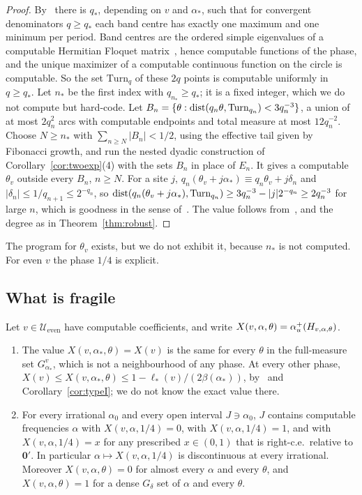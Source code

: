 \begin{proof}
By~\cite[Lemma~5.20(1)]{DMuniv} there is $q_*$, depending on $v$ and $\alpha_*$, such that for convergent denominators $q\ge q_*$ each band centre has exactly one maximum and one minimum per period. Band centres are the ordered simple eigenvalues of a computable Hermitian Floquet matrix~\cite[Lemma~5.3]{DMuniv}, hence computable functions of the phase, and the unique maximizer of a computable continuous function on the circle is computable. So the set $\mathrm{Turn}_q$ of these $2q$ points is computable uniformly in $q\ge q_*$. Let $n_*$ be the first index with $q_{n_*}\ge q_*$; it is a fixed integer, which we do not compute but hard-code. Let $B_n=\{\theta:\operatorname{dist}(q_n\theta,\mathrm{Turn}_{q_n})<3q_n^{-3}\}$, a union of at most $2q_n^2$ arcs with computable endpoints and total measure at most $12q_n^{-2}$. Choose $N\ge n_*$ with $\sum_{n\ge N}|B_n|<1/2$, using the effective tail given by Fibonacci growth, and run the nested dyadic construction of Corollary~\ref{cor:twoexp}(4) with the sets $B_n$ in place of $E_n$. It gives a computable $\theta_v$ outside every $B_n$, $n\ge N$. For a site $j$, $q_n(\theta_v+j\alpha_*)\equiv q_n\theta_v+j\delta_n$ and $|\delta_n|\le1/q_{n+1}\le2^{-q_n}$, so $\operatorname{dist}(q_n(\theta_v+j\alpha_*),\mathrm{Turn}_{q_n})\ge3q_n^{-3}-|j|2^{-q_n}\ge2q_n^{-3}$ for large $n$, which is goodness in the sense of~\cite[Definition~5.21]{DMuniv}. The value follows from~\cite[Theorem~A]{DMuniv}, and the degree as in Theorem~\ref{thm:robust}.
\end{proof}

The program for $\theta_v$ exists, but we do not exhibit it, because $n_*$ is not computed. For even $v$ the phase $1/4$ is explicit.

\subsection{What is fragile}

\begin{theorem}[Fragility]\label{thm:fragile}
Let $v\in\mathcal U_{\mathrm{even}}$ have computable coefficients, and write $X(v,\alpha,\theta)=\alpha_u^+(H_{v,\alpha,\theta})$.
\begin{enumerate}
\item The value $X(v,\alpha_*,\theta)=X(v)$ is the same for every $\theta$ in the full-measure set $G^v_{\alpha_*}$, which is not a neighbourhood of any phase. At every other phase, $X(v)\le X(v,\alpha_*,\theta)\le1-\ell_*(v)/(2\beta(\alpha_*))$, by~\cite[Theorem~A]{DMuniv} and Corollary~\ref{cor:typeI}; we do not know the exact value there.
\item For every irrational $\alpha_0$ and every open interval $J\ni\alpha_0$, $J$ contains computable frequencies $\alpha$ with $X(v,\alpha,1/4)=0$, with $X(v,\alpha,1/4)=1$, and with $X(v,\alpha,1/4)=x$ for any prescribed $x\in(0,1)$ that is right-c.e.\ relative to $\mathbf 0'$. In particular $\alpha\mapsto X(v,\alpha,1/4)$ is discontinuous at every irrational. Moreover $X(v,\alpha,\theta)=0$ for almost every $\alpha$ and every $\theta$, and $X(v,\alpha,\theta)=1$ for a dense $G_\delta$ set of $\alpha$ and every $\theta$.
\end{enumerate}
\end{theorem}

